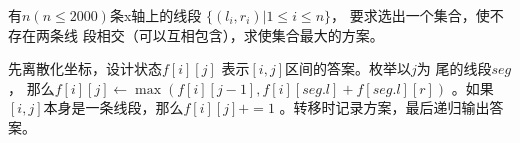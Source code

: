 \begin{prob}
	有$n(n \le 2000)$条x轴上的线段
	$\{(l_i,r_i)|1\le i\le n\}$，
	要求选出一个集合，使不存在两条线
	段相交（可以互相包含），求使集合最大的方案。
\end{prob}

\begin{sol}
	先离散化坐标，设计状态$f[i][j]$
	表示$[i,j]$区间的答案。枚举以$j$为
	尾的线段$seg$，
	那么$f[i][j] \gets \max(f[i][j-1],f[i][seg.l]+f[seg.l][r])$
	。如果$[i,j]$本身是一条线段，那么$f[i][j]+=1$
	。转移时记录方案，最后递归输出答案。
\end{sol}
